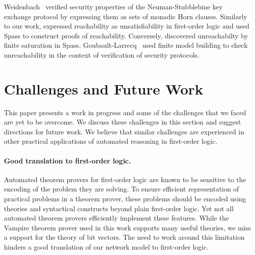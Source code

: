Weidenbach~\cite{Weidenbach99} verified security properties of the Neuman-Stubblebine key exchange protocol by expressing them as sets of monadic Horn clauses. Similarly to our work, \cite{Weidenbach99} expressed reachability as unsatisfiability in first-order logic and used Spass to construct proofs of reachability. Conversely, \cite{Weidenbach99} discovered unreachabilty by finite saturation in Spass. Goubault-Larrecq~\cite{DBLP:journals/jcs/Goubault-Larrecq10} used finite model building to check unreachability in the context of verification of security protocols.






\section{Challenges and Future Work}
\label{sect:aws/challenges}
This paper presents a work in progress and some of the challenges that we faced are yet to be overcome. We discuss these challenges in this section and suggest directions for future work. We believe that similar challenges are experienced in other practical applications of automated reasoning in first-order logic.

\paragraph{Good translation to first-order logic.}
Automated theorem provers for first-order logic are known to be sensitive to the encoding of the problem they are solving. To ensure efficient representation of practical problems in a theorem prover, these problems should be encoded using theories and syntactical constructs beyond plain first-order logic. Yet not all automated theorem provers efficiently implement these features. While the Vampire theorem prover used in this work supports many useful theories, we miss a support for the theory of bit vectors. The need to work around this limitation hinders a good translation of our network model to first-order logic. %

